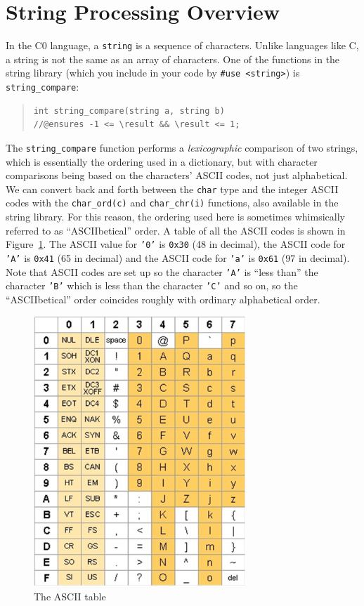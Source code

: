 \documentclass[12pt]{exam}
\begin{document}
\newpage
\appendix
\section{String Processing Overview}
\label{sec:strings}

In the C0 language, a \lstinline'string' is a sequence of
characters. Unlike languages like C, a string is not the same as an
array of characters. One of the functions in the string library
(which you include in your code by \lstinline+#use <string>+) is
\lstinline'string_compare':
\begin{quote}
\begin{lstlisting}[basicstyle=\smallbasicstyle]
int string_compare(string a, string b)
//@ensures -1 <= \result && \result <= 1;
\end{lstlisting}
\end{quote}
The \lstinline'string_compare' function performs a
\emph{lexicographic} comparison of two strings, which is essentially
the ordering used in a dictionary, but with character comparisons
being based on the characters' ASCII codes, not just alphabetical. We
can convert back and forth between the \lstinline'char' type and the
integer ASCII codes with the \lstinline'char_ord(c)' and
\lstinline'char_chr(i)' functions, also available in the string
library.  For this reason, the ordering used here is sometimes
whimsically referred to as ``ASCIIbetical'' order.  A table of all the
ASCII codes is shown in Figure~\ref{fig:asciitable}.  The ASCII value
for \texttt{'0'} is \lstinline'0x30' (48 in decimal), the ASCII code
for \texttt{'A'} is \lstinline'0x41' (65 in decimal) and the ASCII
code for \texttt{'a'} is \lstinline'0x61' (97 in decimal). Note that
ASCII codes are set up so the character \texttt{'A'} is ``less than''
the character \texttt{'B'} which is less than the character
\texttt{'C'} and so on, so the ``ASCIIbetical'' order coincides
roughly with ordinary alphabetical order.

\bigskip
\bigskip

\begin{figure}[hb]
\centering
    \includegraphics[width=80mm]{img/asciitable.png}
\caption{The ASCII table}
\label{fig:asciitable}
\end{figure}
\end{document}
